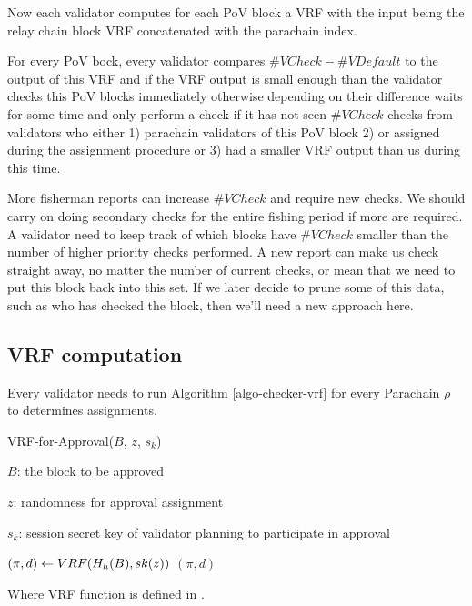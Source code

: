 Now each validator computes for each PoV block a VRF with the input being the relay chain block VRF concatenated with the parachain index. 

For every PoV bock, every validator compares $\#VCheck - \#VDefault$ to the output of this VRF and if the VRF output is small enough than the validator checks this PoV blocks immediately otherwise depending on their difference waits for some time and only perform a check if it has not seen $\#VCheck$ checks from validators who either 1) parachain validators of this PoV block 2) or assigned during the assignment procedure or 3) had a smaller VRF output than us during this time.

More fisherman reports can increase $\#VCheck$ and require new checks. We should carry on doing secondary checks for the entire fishing period if more are required. A validator need to keep track of which blocks have $\#VCheck$ smaller than the number of higher priority checks performed. A new report can make us check straight away, no matter the number of current checks, or mean that we need to put this block back into this set. If we later decide to prune some of this data, such as who has checked the block, then we'll need a new approach here.

\subsection{VRF computation}

Every validator needs to run Algorithm \ref{algo-checker-vrf} for every Parachain $\rho$ to determines assignments.  

\begin{algorithm}
  \caption[VRF-for-Approval]{\sc VRF-for-Approval($B$, $z$, $s_k$)}
  \label{algo-checker-vrf}
  \begin{algorithmic}[1]
  \Require

    $B$: the block to be approved 

    $z$: randomness for approval assignment

    $s_k$: session secret key of validator planning to participate in approval

    \State $(\pi, d) \leftarrow {\sc VRF}(H_h(B),sk(z))$
    \State \Return $(\pi,d)$
  \end{algorithmic}
\end{algorithm}

Where {\sc VRF} function is defined in \cite{polkadot-crypto-spec}.

